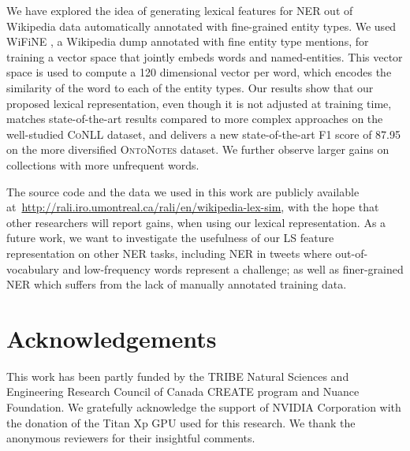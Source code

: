 \documentclass[11pt]{article}
\newcommand{\conll}{\textsc{CoNLL}}
\newcommand{\onto}{\textsc{OntoNotes}}
\newcommand{\lr}{\textsc{LS}}
\newcommand{\wifine}{WiFiNE}
\begin{document}
	We have explored the idea of generating lexical features for NER out of Wikipedia data automatically annotated with fine-grained entity types. We used \wifine{ }\cite{ghaddara2018wifine}, a Wikipedia dump annotated with fine entity type mentions, for training a vector space that jointly embeds words and named-entities. This vector space is used to compute a 120 dimensional vector per word, which encodes the similarity of the word to each of the entity types. Our results show that our proposed lexical representation, even though it is not adjusted at training time, matches state-of-the-art results compared to more complex approaches on the well-studied \conll{} dataset, and delivers a new state-of-the-art F1 score of 87.95 on the more diversified \onto{} dataset. We further observe larger gains  on collections  with more unfrequent words. 

	The source code and the data we used in this work are publicly available at~\url{http://rali.iro.umontreal.ca/rali/en/wikipedia-lex-sim}, with the hope that other researchers will report gains, when using our lexical representation.	As a future work, we want to investigate the usefulness of our \lr{} feature representation on other NER tasks, including NER in tweets where  out-of-vocabulary and low-frequency words represent a challenge; as well as finer-grained NER which suffers  from the lack of manually annotated training data. 
	
	\section*{Acknowledgements}
	This work has been partly funded by the TRIBE Natural Sciences and Engineering Research Council of Canada CREATE program and Nuance Foundation. We gratefully acknowledge the support of NVIDIA Corporation with the donation of the Titan Xp GPU used for this research. We thank the anonymous reviewers for their insightful comments.
	

	
	
	
\end{document}
